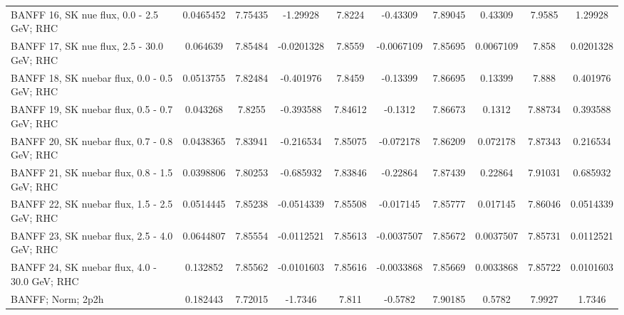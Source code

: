 \begin{tabular}{| l | S | S  S | S  S | S  S | S  S | }
                                       BANFF 16, SK nue flux, 0.0 - 2.5 GeV; RHC &       0.0465452 &         7.75435 &        -1.29928 &          7.8224 &        -0.43309 &         7.89045 &         0.43309 &          7.9585 &         1.29928 \\ 
                                      BANFF 17, SK nue flux, 2.5 - 30.0 GeV; RHC &        0.064639 &         7.85484 &      -0.0201328 &          7.8559 &      -0.0067109 &         7.85695 &       0.0067109 &           7.858 &       0.0201328 \\ 
                                    BANFF 18, SK nuebar flux, 0.0 - 0.5 GeV; RHC &       0.0513755 &         7.82484 &       -0.401976 &          7.8459 &        -0.13399 &         7.86695 &         0.13399 &           7.888 &        0.401976 \\ 
                                    BANFF 19, SK nuebar flux, 0.5 - 0.7 GeV; RHC &        0.043268 &          7.8255 &       -0.393588 &         7.84612 &         -0.1312 &         7.86673 &          0.1312 &         7.88734 &        0.393588 \\ 
                                    BANFF 20, SK nuebar flux, 0.7 - 0.8 GeV; RHC &       0.0438365 &         7.83941 &       -0.216534 &         7.85075 &       -0.072178 &         7.86209 &        0.072178 &         7.87343 &        0.216534 \\ 
                                    BANFF 21, SK nuebar flux, 0.8 - 1.5 GeV; RHC &       0.0398806 &         7.80253 &       -0.685932 &         7.83846 &        -0.22864 &         7.87439 &         0.22864 &         7.91031 &        0.685932 \\ 
                                    BANFF 22, SK nuebar flux, 1.5 - 2.5 GeV; RHC &       0.0514445 &         7.85238 &      -0.0514339 &         7.85508 &       -0.017145 &         7.85777 &        0.017145 &         7.86046 &       0.0514339 \\ 
                                    BANFF 23, SK nuebar flux, 2.5 - 4.0 GeV; RHC &       0.0644807 &         7.85554 &      -0.0112521 &         7.85613 &      -0.0037507 &         7.85672 &       0.0037507 &         7.85731 &       0.0112521 \\ 
                                   BANFF 24, SK nuebar flux, 4.0 - 30.0 GeV; RHC &        0.132852 &         7.85562 &      -0.0101603 &         7.85616 &      -0.0033868 &         7.85669 &       0.0033868 &         7.85722 &       0.0101603 \\ 
                                                               BANFF; Norm; 2p2h &        0.182443 &         7.72015 &         -1.7346 &           7.811 &         -0.5782 &         7.90185 &          0.5782 &          7.9927 &          1.7346 \\ 

\end{tabular}
